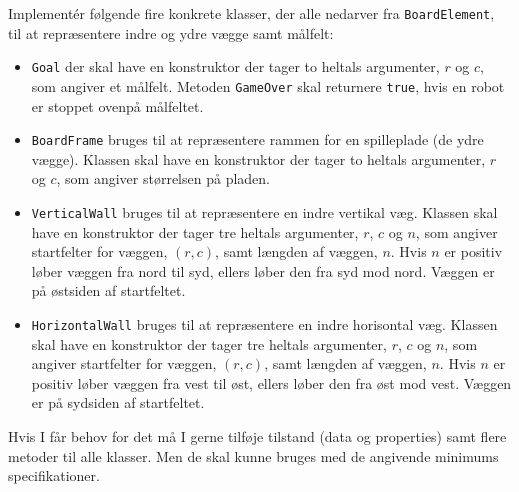 
Implementér følgende fire konkrete klasser, der alle nedarver fra
\lstinline{BoardElement}, til at repræsentere indre og ydre vægge samt målfelt:

\begin{itemize}
\item \lstinline{Goal} der skal have en konstruktor der tager to
  heltals argumenter, $r$ og $c$, som angiver et målfelt. Metoden
  \lstinline{GameOver} skal returnere \lstinline{true}, hvis en robot
  er stoppet ovenpå målfeltet.
\item \lstinline{BoardFrame} bruges til at repræsentere rammen for
  en spilleplade (de ydre vægge). Klassen skal have en konstruktor der tager to
  heltals argumenter, $r$ og $c$, som angiver størrelsen på pladen.
\item \lstinline{VerticalWall} bruges til at repræsentere en indre
  vertikal væg. Klassen skal have en konstruktor der tager tre
  heltals argumenter, $r$, $c$ og $n$, som angiver startfelter for
  væggen, $(r,c)$, samt længden af væggen, $n$. Hvis $n$ er positiv
  løber væggen fra nord til syd, ellers løber den fra syd mod
  nord. Væggen er på østsiden af startfeltet.
\item \lstinline{HorizontalWall} bruges til at repræsentere en indre
  horisontal væg. Klassen skal have en konstruktor der tager tre
  heltals argumenter, $r$, $c$ og $n$, som angiver startfelter for
  væggen, $(r,c)$, samt længden af væggen, $n$. Hvis $n$ er positiv
  løber væggen fra vest til øst, ellers løber den fra øst mod
  vest. Væggen er på sydsiden af startfeltet.
\end{itemize}

Hvis I får behov for det må I gerne tilføje tilstand (data og
properties) samt flere metoder til alle klasser. Men de skal kunne
bruges med de angivende minimums specifikationer.





